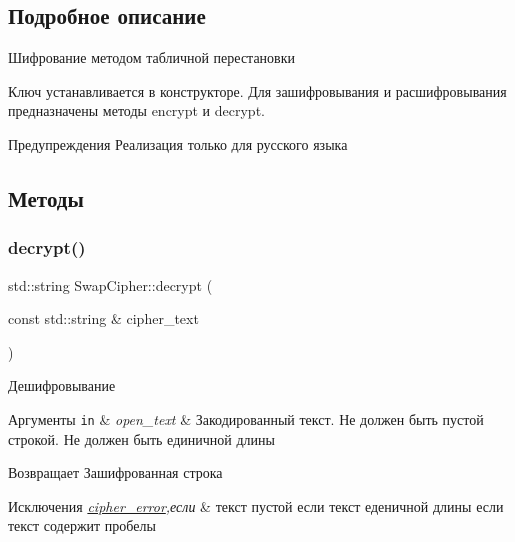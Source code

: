 \subsection{Подробное описание}
Шифрование методом табличной перестановки 

Ключ устанавливается в конструкторе. Для зашифровывания и расшифровывания предназначены методы encrypt и decrypt. \begin{DoxyWarning}{Предупреждения}
Реализация только для русского языка 
\end{DoxyWarning}


\subsection{Методы}
\mbox{\label{classSwapCipher_a198011fc3328030ef7c2493cd0b5abeb}} 
\subsubsection{\texorpdfstring{decrypt()}{decrypt()}}
{\footnotesize\ttfamily std\+::string Swap\+Cipher\+::decrypt (\begin{DoxyParamCaption}\item[{const std\+::string \&}]{cipher\+\_\+text }\end{DoxyParamCaption})}



Дешифровывание 


\begin{DoxyParams}[1]{Аргументы}
\mbox{\tt in}  & {\em open\+\_\+text} & Закодированный текст. Не должен быть пустой строкой. Не должен быть единичной длины \\
\hline
\end{DoxyParams}
\begin{DoxyReturn}{Возвращает}
Зашифрованная строка 
\end{DoxyReturn}

\begin{DoxyExceptions}{Исключения}
{\em \hyperlink{classcipher__error}{cipher\+\_\+error},если} & текст пустой если текст еденичной длины если текст содержит пробелы \\
\hline
\end{DoxyExceptions}
\mbox{\label{classSwapCipher_adab0495fb3203c0214143969d9945573}} 
